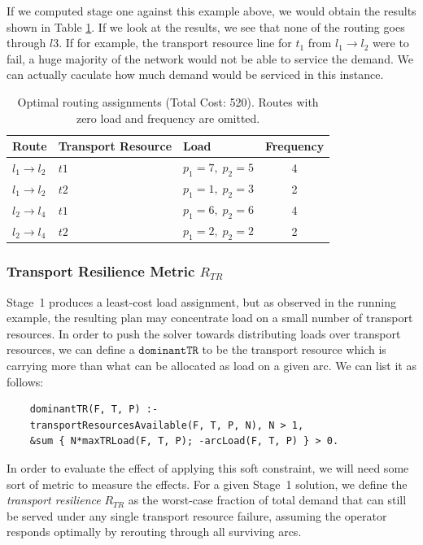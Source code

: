 \documentclass{article}
\begin{document}
If we computed stage one against this example above, we would obtain the results shown in Table \ref{tab:routing-assignments}. If we look at the results, we see that none of the routing goes through $l3$. If for example, the transport resource line for $t_1$ from $l_1 \rightarrow l_2$ were to fail, a huge majority of the network would not be able to service the demand. We can actually caculate how much demand would be serviced in this instance.
\begin{table}[h]
\centering
\begin{tabular}{|l|l|l|c|}

\hline
\textbf{Route} & \textbf{Transport Resource} & \textbf{Load} & \textbf{Frequency} \\
\hline
$l_1 \to l_2$ & $t1$ & $p_1=7,\; p_2=5$ & 4 \\
\hline
$l_1 \to l_2$ & $t2$ & $p_1=1,\; p_2=3$ & 2 \\
\hline
$l_2 \to l_4$ & $t1$ & $p_1=6,\; p_2=6$ & 4 \\
\hline
$l_2 \to l_4$ & $t2$ & $p_1=2,\; p_2=2$ & 2 \\
\hline

\end{tabular}
\caption{Optimal routing assignments (Total Cost: 520). Routes with zero load and frequency are omitted.}
\label{tab:routing-assignments}
\end{table}
\subsubsection{Transport Resilience Metric $R_{TR}$}
\label{sec:rtr}

Stage~1 produces a least-cost load assignment, but as observed in
the running example, the resulting plan may concentrate load on a
small number of transport resources. In order to push the solver towards distributing loads over transport resources, we can define a $\texttt{dominantTR}$ to be the transport resource which is carrying more than what can be allocated as load on a given arc. We can list it as follows:
\begin{lstlisting}
    dominantTR(F, T, P) :-
    transportResourcesAvailable(F, T, P, N), N > 1,
    &sum { N*maxTRLoad(F, T, P); -arcLoad(F, T, P) } > 0.
\end{lstlisting}

In order to evaluate the effect of applying this soft constraint, we will need some sort of metric to measure the effects. For a given Stage~1 solution, we define the \emph{transport
resilience} $R_{TR}$ as the worst-case fraction of total demand
that can still be served under any single transport resource
failure, assuming the operator responds optimally by rerouting
through all surviving arcs.
\end{document}
